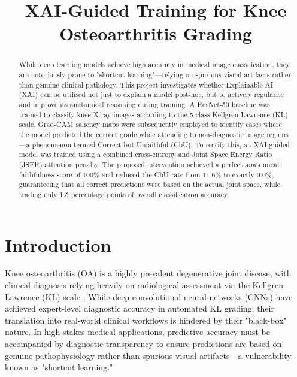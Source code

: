 \documentclass[conference]{IEEEtran}
\begin{document}
\title{XAI-Guided Training for Knee Osteoarthritis Grading}

\author{
}

\maketitle

\begin{abstract}
While deep learning models achieve high accuracy in medical image classification, they are notoriously prone to "shortcut learning"—relying on spurious visual artifacts rather than genuine clinical pathology. This project investigates whether Explainable AI (XAI) can be utilised not just to explain a model post-hoc, but to actively regularise and improve its anatomical reasoning during training. A ResNet-50 baseline was trained to classify knee X-ray images according to the 5-class Kellgren-Lawrence (KL) scale. Grad-CAM saliency maps were subsequently employed to identify cases where the model predicted the correct grade while attending to non-diagnostic image regions—a phenomenon termed Correct-but-Unfaithful (CbU). To rectify this, an XAI-guided model was trained using a combined cross-entropy and Joint Space Energy Ratio (JSER) attention penalty. The proposed intervention achieved a perfect anatomical faithfulness score of 100\% and reduced the CbU rate from 11.6\% to exactly 0.0\%, guaranteeing that all correct predictions were based on the actual joint space, while trading only 1.5 percentage points of overall classification accuracy.
\end{abstract}

\section{Introduction}

Knee osteoarthritis (OA) is a highly prevalent degenerative joint disease, with clinical diagnosis relying heavily on radiological assessment via the Kellgren-Lawrence (KL) scale \cite{kellgren1957}. While deep convolutional neural networks (CNNs) have achieved expert-level diagnostic accuracy in automated KL grading, their translation into real-world clinical workflows is hindered by their "black-box" nature. In high-stakes medical applications, predictive accuracy must be accompanied by diagnostic transparency to ensure predictions are based on genuine pathophysiology rather than spurious visual artifacts—a vulnerability known as "shortcut learning."
\end{document}
